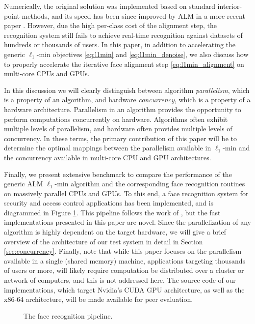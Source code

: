 \documentclass[10pt,twocolumn,letterpaper]{article}
\begin{document}
Numerically, the original solution \cite{WagnerA2009-CVPR} was implemented based 
on standard interior-point methods, and its speed has been since improved by ALM in a more recent paper
\cite{WagnerA2011-PAMI}. However, due the high per-class cost
of the alignment step, the recognition system still fails to achieve real-time recognition against datasets of hundreds or thousands of users.
In this paper, in addition to accelerating the generic
$\ell_1$-min objectives \eqref{eq:l1min} and \eqref{eq:l1min_denoise}, we 
also discuss how to properly accelerate the iterative face alignment step
\eqref{eq:l1min_alignment} on multi-core CPUs and GPUs.

In this discussion we will clearly distinguish between algorithm {\em parallelism},
which is a property of an algorithm, and hardware {\em concurrency}, which is a
property of a hardware architecture. Parallelism in an algorithm provides the
opportunity to perform computations concurrently on hardware.  Algorithms often
exhibit multiple levels of parallelism, and hardware often provides multiple
levels of concurrency.  In these terms, the primary contribution of this paper
will be to determine the optimal mappings between the parallelism available in
$\ell_1$-min and the concurrency available in multi-core CPU and GPU
architectures.

Finally, we present extensive benchmark to compare the performance of the
generic ALM $\ell_1$-min algorithm and the corresponding face recognition
routines on massively parallel CPUs and GPUs.  To this end, a face
recognition system for security and access control applications has been implemented, 
and is diagrammed in Figure \ref{fig:pipeline}. This pipeline follows the work of \cite{WagnerA2011-PAMI}, but
the fast implementations presented in this paper are novel.
Since the parallelization of any algorithm
is highly dependent on the target hardware, we will give a brief overview of
the architecture of our test system in detail in Section
\ref{sec:concurrency}.
Finally, note that 
while this paper focuses on the parallelism available in a single (shared memory) machine,
applications targeting thousands of users or more, will likely require computation be
distributed over a cluster or network of computers, and this is not addressed here.
The source code of our implementations, which target Nvidia's CUDA GPU architecture,
as well as the x86-64 architecture, will be made available for peer evaluation.
\begin{figure}
\centering
{\tiny }
\caption{The face recognition pipeline.}
\label{fig:pipeline}
\end{figure}
\end{document}
